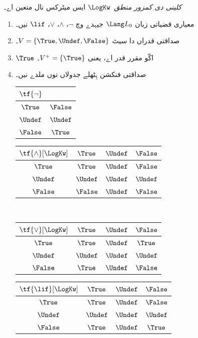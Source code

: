 \documentclass[../../../include/open-logic-section]{subfiles}
\begin{document}
\begin{defn}
\emph{کلینی دی کمزور منطق}~$\LogKw$ ایس میٹرکس نال متعین اے۔
\begin{enumerate}
  \item معیاری قضیاتی زبان $\Lang L_0$ جیہدے وچ
  $\lnot$، $\land$، $\lor$، $\lif$ نیں۔
  \item صداقتی قدراں دا سیٹ $V = \{\True, \Undef, \False\}$۔
  \item $\True$ اکّو مقرر قدر اے، یعنی $V^+ = \{\True\}$۔
  \item صداقتی فنکشن ہِٹھلے جدولاں توں ملدے نیں۔
  \begin{center}
    \begin{tabular}{c|c} 
      $\tf{\lnot}$ & \\ 
      \hline  
      $\True$ & $\False$ \\ 
      $\Undef$ & $\Undef$ \\
      $\False$ & $\True$ 
    \end{tabular}
    \quad
    \begin{tabular}{c|ccc} 
      $\tf{\land}[\LogKw]$ & $\True$ & $\Undef$ & $\False$ \\ 
      \hline 
      $\True$ & $\True$ & $\Undef$ & $\False$ \\ 
      $\Undef$ & $\Undef$ & $\Undef$ & $\Undef$\\ 
      $\False$ & $\False$ & $\Undef$ & $\False$ 
    \end{tabular}
    \\[2ex]
    \begin{tabular}{c|ccc} 
      $\tf{\lor}[\LogKw]$ & $\True$ & $\Undef$ & $\False$ \\ 
      \hline 
      $\True$ & $\True$ & $\Undef$ & $\True$ \\ 
      $\Undef$ & $\Undef$ & $\Undef$ & $\Undef$ \\
      $\False$ & $\True$ & $\Undef$ & $\False$ 
    \end{tabular}
    \quad
    \begin{tabular}{c|ccc} 
      $\tf{\lif}[\LogKw]$ & $\True$ & $\Undef$ & $\False$ \\ 
      \hline 
      $\True$ & $\True$ & $\Undef$ & $\False$ \\ 
      $\Undef$ & $\Undef$ & $\Undef$ & $\Undef$  \\ 
      $\False$ & $\True$ & $\Undef$ & $\True$ 
    \end{tabular}
  \end{center}
\end{enumerate}
\end{defn}
\end{document}
